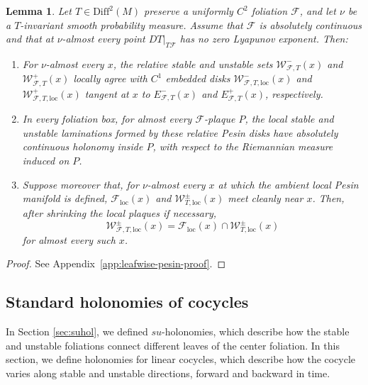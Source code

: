 \documentclass[11pt]{amsart}
\numberwithin{equation}{section}
\newcommand{\Diff}{\mathrm{Diff}}
\theoremstyle{plain}
\newtheorem{lem}[thm]{Lemma}
\begin{document}
\begin{lem}\label{lem:leafwise-pesin-ac}
Let $T\in\Diff^2(M)$ preserve a uniformly $C^2$ foliation $\mathcal F$, and
let $\nu$ be a $T$-invariant smooth probability measure.  Assume that
$\mathcal F$ is absolutely continuous and that at $\nu$-almost every point $DT|_{T\mathcal F}$ has no
zero Lyapunov exponent.  Then:
\begin{enumerate}
\item For $\nu$-almost every $x$, the relative stable and unstable sets
$\mathcal W^-_{\mathcal F,T}(x)$ and
$\mathcal W^+_{\mathcal F,T}(x)$ locally agree with $C^1$ embedded disks
$\mathcal W^-_{\mathcal F,T,\mathrm{loc}}(x)$ and
$\mathcal W^+_{\mathcal F,T,\mathrm{loc}}(x)$ tangent at $x$ to
$E^-_{\mathcal F,T}(x)$ and $E^+_{\mathcal F,T}(x)$, respectively.

\item In every foliation box, for almost every $\mathcal F$-plaque $P$, the
local stable and unstable laminations formed by these relative Pesin disks
have absolutely continuous holonomy inside $P$, with respect to the
Riemannian measure induced on $P$.

\item Suppose moreover that, for $\nu$-almost every $x$ at which the ambient
local Pesin manifold is defined, $\mathcal F_{\mathrm{loc}}(x)$ and
$\mathcal W^{\pm}_{T,\mathrm{loc}}(x)$ meet cleanly near $x$.  Then,
after shrinking the local plaques if necessary,
\[
\mathcal W^{\pm}_{\mathcal F,T,\mathrm{loc}}(x)
 =\mathcal F_{\mathrm{loc}}(x)
  \cap\mathcal W^{\pm}_{T,\mathrm{loc}}(x)
\]
for almost every such $x$.
\end{enumerate}
\end{lem}

\begin{proof}
See Appendix~\ref{app:leafwise-pesin-proof}.
\end{proof}


\subsection{Standard holonomies of cocycles}

In Section \ref{sec:suhol}, we defined $su$-holonomies, which describe how the stable and unstable foliations connect different leaves of the center foliation. In this section, we define holonomies for linear cocycles, which describe how the cocycle varies along stable and unstable directions, forward and backward in time.
\end{document}
